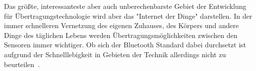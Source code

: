 \begin{multicols}{3}
Das größte, interessanteste aber auch unberechenbarste Gebiet der Entwicklung für Übertragungstechnologie wird aber das "Internet der Dinge" darstellen. In der immer schnelleren Vernetzung des eigenen Zuhauses, des Körpers und andere Dinge des täglichen Lebens werden Übertragungsmöglichkeiten zwischen den Sensoren immer wichtiger. Ob sich der Bluetooth Standard dabei durchsetzt ist aufgrund der Schnelllebigkeit in Gebieten der Technik allerdings nicht zu beurteilen~\cite{BLE.1}.

\printbibliography[segment=4,heading=subbibliography]
\end{multicols}

\newpage

